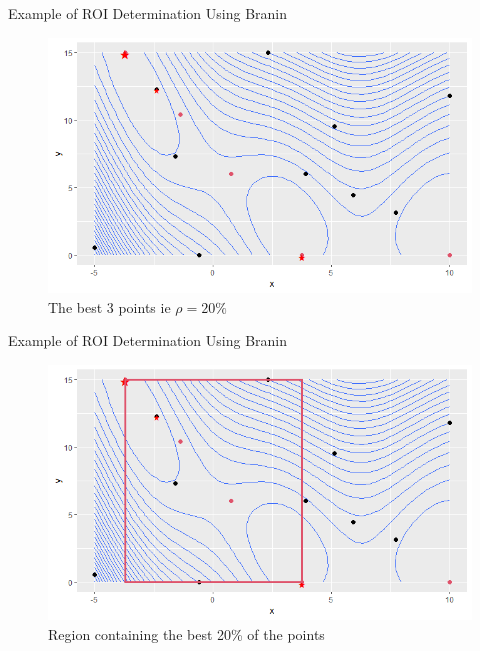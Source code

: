 \documentclass{beamer}
\begin{document}
\begin{frame}{Example of ROI Determination Using Branin}
    \begin{figure}
        \centering
        \includegraphics[scale=.5]{images/branin/R2.png}
        \caption{The best 3 points ie $\rho = 20\%$}
        \label{fig:branin2}
    \end{figure}
\end{frame}
\begin{frame}{Example of ROI Determination Using Branin}
    \begin{figure}
        \centering
        \includegraphics[scale=.5]{images/branin/R3.png}
        \caption{Region containing the best 20\% of the points}
        \label{fig:branin3}
    \end{figure}
\end{frame}
\end{document}
